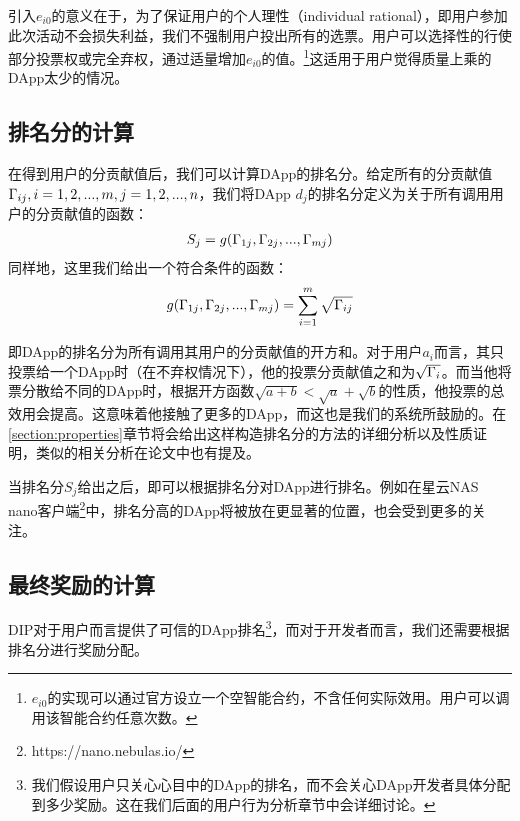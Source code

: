 引入$e_{i0}$的意义在于，为了保证用户的个人理性（individual rational），即用户参加此次活动不会损失利益，我们不强制用户投出所有的选票。用户可以选择性的行使部分投票权或完全弃权，通过适量增加$e_{i0}$的值。\footnote{$e_{i0}$的实现可以通过官方设立一个空智能合约，不含任何实际效用。用户可以调用该智能合约任意次数。}这适用于用户觉得质量上乘的DApp太少的情况。


\subsection{排名分的计算}
在得到用户的分贡献值后，我们可以计算DApp的排名分。给定所有的分贡献值$\Gamma_{ij}, i=1,2,...,m,j=1,2,...,n$，我们将DApp $d_j$的排名分定义为关于所有调用用户的分贡献值的函数：
\begin{align}
S_j = g(\Gamma_{1j},\Gamma_{2j},...,\Gamma_{mj})
\end{align}
同样地，这里我们给出一个符合条件的函数：
\begin{align}
\label{eq:sqrt}
g(\Gamma_{1j},\Gamma_{2j},...,\Gamma_{mj}) = \sum_{i=1}^m \sqrt{\Gamma_{ij}}
\end{align}

即DApp的排名分为所有调用其用户的分贡献值的开方和。对于用户$a_i$而言，其只投票给一个DApp时（在不弃权情况下），他的投票分贡献值之和为$\sqrt{\Gamma_i}$。而当他将票分散给不同的DApp时，根据开方函数$\sqrt{a+b}<\sqrt{a}+\sqrt{b}$的性质，他投票的总效用会提高。这意味着他接触了更多的DApp，而这也是我们的系统所鼓励的。在\ref{section:properties}章节将会给出这样构造排名分的方法的详细分析以及性质证明，类似的相关分析在论文\cite{buterin2018liberal}中也有提及。


当排名分$S_j$给出之后，即可以根据排名分对DApp进行排名。例如在星云NAS nano客户端\footnote{https://nano.nebulas.io/}中，排名分高的DApp将被放在更显著的位置，也会受到更多的关注。


\subsection{最终奖励的计算}
DIP对于用户而言提供了可信的DApp排名\footnote{我们假设用户只关心心目中的DApp的排名，而不会关心DApp开发者具体分配到多少奖励。这在我们后面的用户行为分析章节中会详细讨论。}，而对于开发者而言，我们还需要根据排名分进行奖励分配。

